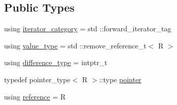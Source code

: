 \subsection*{Public Types}
\begin{DoxyCompactItemize}
\item 
using \mbox{\hyperlink{structrah_1_1iterator__facade_3_01_i_00_01_r_00_01std_01_1_1forward__iterator__tag_01_4_a3c1278be55ca5af439eb79e2ee9a3c49}{iterator\+\_\+category}} = std \+::forward\+\_\+iterator\+\_\+tag
\item 
using \mbox{\hyperlink{structrah_1_1iterator__facade_3_01_i_00_01_r_00_01std_01_1_1forward__iterator__tag_01_4_a382051259e4c6ce57365cbdd02e6536e}{value\+\_\+type}} = std \+::remove\+\_\+reference\+\_\+t$<$ R $>$
\item 
using \mbox{\hyperlink{structrah_1_1iterator__facade_3_01_i_00_01_r_00_01std_01_1_1forward__iterator__tag_01_4_abc2f97747157d90d76075b0df9a236f0}{difference\+\_\+type}} = intptr\+\_\+t
\item 
typedef pointer\+\_\+type$<$ R $>$\+::type \mbox{\hyperlink{structrah_1_1iterator__facade_3_01_i_00_01_r_00_01std_01_1_1forward__iterator__tag_01_4_a40719192500f32f440a6c838e29ada32}{pointer}}
\item 
using \mbox{\hyperlink{structrah_1_1iterator__facade_3_01_i_00_01_r_00_01std_01_1_1forward__iterator__tag_01_4_afc82a925c7d3fa3959bc9e8fc96dc582}{reference}} = R
\end{DoxyCompactItemize}
